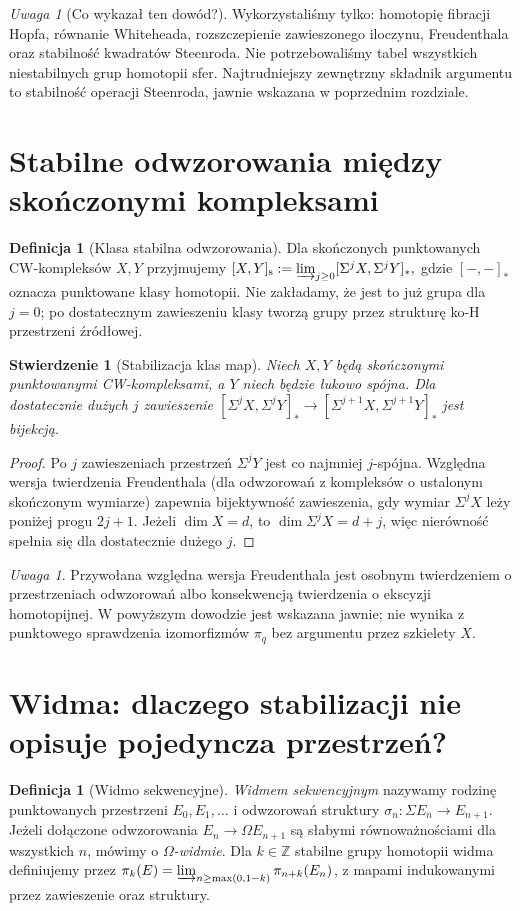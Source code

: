 \documentclass[11pt,a4paper,oneside]{report}
\newcommand{\Z}{\mathbb{Z}}
\theoremstyle{plain}
\newtheorem{stwierdzenie}[twierdzenie]{Stwierdzenie}
\theoremstyle{definition}
\newtheorem{definicja}[twierdzenie]{Definicja}
\theoremstyle{remark}
\newtheorem{uwaga}[twierdzenie]{Uwaga}
\begin{document}
\begin{uwaga}[Co wykazał ten dowód?]
Wykorzystaliśmy tylko: homotopię fibracji Hopfa,
równanie Whiteheada, rozszczepienie zawieszonego
iloczynu, Freudenthala oraz stabilność kwadratów
Steenroda. Nie potrzebowaliśmy tabel wszystkich
niestabilnych grup homotopii sfer. Najtrudniejszy
zewnętrzny składnik argumentu to stabilność operacji
Steenroda, jawnie wskazana w poprzednim rozdziale.
\end{uwaga}

\section{Stabilne odwzorowania między skończonymi kompleksami}
\begin{definicja}[Klasa stabilna odwzorowania]
Dla skończonych punktowanych CW-kompleksów $X,Y$
przyjmujemy
$[X,Y]_{\mathrm s}:=\varinjlim_{j\ge0}
[\Sigma^jX,\Sigma^jY]_*,$
gdzie $[-,-]_*$ oznacza punktowane klasy homotopii.
Nie zakładamy, że jest to już grupa dla $j=0$;
po dostatecznym zawieszeniu klasy tworzą grupy
przez strukturę ko-H przestrzeni źródłowej.
\end{definicja}

\begin{stwierdzenie}[Stabilizacja klas map]
Niech $X,Y$ będą skończonymi punktowanymi
CW-kompleksami, a $Y$ niech będzie łukowo spójna.
Dla dostatecznie dużych $j$ zawieszenie
$[\Sigma^jX,\Sigma^jY]_*
\to[\Sigma^{j+1}X,\Sigma^{j+1}Y]_*$
jest bijekcją.
\end{stwierdzenie}
\begin{proof}
Po $j$ zawieszeniach przestrzeń $\Sigma^jY$
jest co najmniej $j$-spójna. Względna wersja
twierdzenia Freudenthala (dla odwzorowań z kompleksów
o ustalonym skończonym wymiarze) zapewnia
bijektywność zawieszenia, gdy wymiar $\Sigma^jX$
leży poniżej progu $2j+1$.
Jeżeli $\dim X=d$, to $\dim\Sigma^jX=d+j$,
więc nierówność spełnia się dla dostatecznie dużego $j$.
\end{proof}
\begin{uwaga}
Przywołana względna wersja Freudenthala jest
osobnym twierdzeniem o przestrzeniach odwzorowań
albo konsekwencją twierdzenia o ekscyzji
homotopijnej. W powyższym dowodzie jest wskazana
jawnie; nie wynika z punktowego sprawdzenia
izomorfizmów $\pi_q$ bez argumentu przez szkielety $X$.
\end{uwaga}

\section{Widma: dlaczego stabilizacji nie opisuje pojedyncza przestrzeń?}
\begin{definicja}[Widmo sekwencyjne]
\emph{Widmem sekwencyjnym} nazywamy rodzinę
punktowanych przestrzeni $E_0,E_1,\ldots$ i
odwzorowań struktury $\sigma_n:\Sigma E_n\to E_{n+1}$.
Jeżeli dołączone odwzorowania $E_n\to\Omega E_{n+1}$
są słabymi równoważnościami dla wszystkich $n$,
mówimy o \emph{$\Omega$-widmie}.
Dla $k\in\Z$ stabilne grupy homotopii widma
definiujemy przez
$\pi_k(E)=\varinjlim_{n\ge\max(0,1-k)}\pi_{n+k}(E_n)$,
z mapami indukowanymi przez zawieszenie oraz struktury.
\end{definicja}
\end{document}
